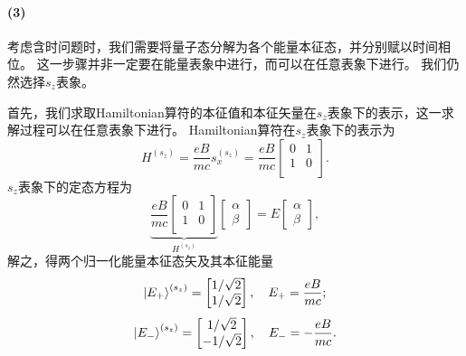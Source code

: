 \begin{tcolorbox}[breakable, title={\textbf{自旋}}]
    \paragraph{(3)}

    考虑含时问题时，我们需要将量子态分解为各个能量本征态，并分别赋以时间相位。
    这一步骤并非一定要在能量表象中进行，而可以在任意表象下进行。
    我们仍然选择$s_z$表象。

    首先，我们求取Hamiltonian算符的本征值和本征矢量在$s_z$表象下的表示，这一求解过程可以在任意表象下进行。
    Hamiltonian算符在$s_z$表象下的表示为
    \begin{equation}
        H^{(s_z)} = \frac{eB}{mc} s_x^{(s_z)} = \frac{eB}{mc}
        \begin{bmatrix}
            0 & 1 \\ 1 & 0\\
        \end{bmatrix}.
    \end{equation}
    $s_z$表象下的定态\schrodinger 方程为
    \begin{equation}
        \underbrace{\frac{eB}{mc}
        \begin{bmatrix}
            0 & 1 \\ 1 & 0\\
        \end{bmatrix}}_{H^{(s_z)}}
        \begin{bmatrix}
            \alpha \\ \beta
        \end{bmatrix}
        = E
        \begin{bmatrix}
            \alpha \\ \beta
        \end{bmatrix},
    \end{equation}
    解之，得两个归一化能量本征态矢及其本征能量
    \begin{equation}
        \ket{E_+}^{(s_z)} =
        \begin{bmatrix}
            1/\sqrt{2} \\ 1/\sqrt{2}
        \end{bmatrix},\quad
        E_+ = \frac{eB}{mc};
    \end{equation}
    \begin{equation}
        \ket{E_-}^{(s_z)} =
        \begin{bmatrix}
            1/\sqrt{2} \\ -1/\sqrt{2}
        \end{bmatrix},\quad
        E_- = -\frac{eB}{mc}.
    \end{equation}


\end{tcolorbox}
